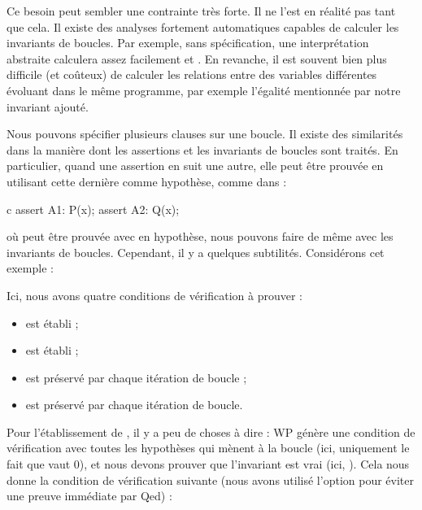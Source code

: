 


\begin{Information}
Ce besoin peut sembler une contrainte très forte. Il ne l'est en réalité pas
tant que cela. Il existe des analyses fortement automatiques capables de
calculer les invariants de boucles. Par exemple, sans spécification, une
interprétation abstraite calculera assez facilement  et
. En revanche,
il est souvent bien plus difficile (et coûteux) de calculer les relations
entre des variables différentes évoluant dans le même programme,
par exemple l'égalité mentionnée par notre invariant ajouté.
\end{Information}


\label{l3:statements-loops-multi-inv}


Nous pouvons spécifier plusieurs clauses  sur une
boucle. Il existe des similarités dans la manière dont les assertions et les
invariants de boucles sont traités. En particulier, quand une assertion en suit
une autre, elle peut être prouvée en utilisant cette dernière comme hypothèse,
comme dans :
\begin{CodeBlock}{c}
assert A1: P(x);
assert A2: Q(x);
\end{CodeBlock}
où  peut être prouvée avec  en hypothèse, nous
pouvons faire de même avec les invariants de boucles. Cependant, il y a
quelques subtilités. Considérons cet exemple :




Ici, nous avons quatre conditions de vérification à prouver :
\begin{itemize}
  \item {} est établi ;
  \item {} est établi ;
  \item {} est préservé par chaque itération de boucle ;
  \item {} est préservé par chaque itération de boucle.
\end{itemize}
Pour l'établissement de , il y a peu de choses à dire : WP
génère une condition de vérification avec toutes les hypothèses qui mènent à la
boucle (ici, uniquement le fait que  vaut 0), et nous devons
prouver que l'invariant est vrai (ici, ). Cela nous donne
la condition de vérification suivante (nous avons utilisé l'option
 pour éviter une preuve immédiate par Qed) :


